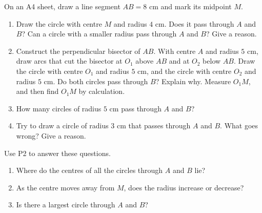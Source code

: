\begin{solvefirst}
  \item On an A4 sheet, draw a line segment $AB=8$ cm and mark its midpoint $M$.
  \begin{enumerate}[label=(\alph*),itemsep=1pt]
    \item Draw the circle with centre $M$ and radius $4$ cm. Does it pass through $A$ and $B$? Can a circle with a smaller radius pass through $A$ and $B$? Give a reason.
    \item Construct the perpendicular bisector of $AB$. With centre $A$ and radius $5$ cm, draw arcs that cut the bisector at $O_1$ above $AB$ and at $O_2$ below $AB$. Draw the circle with centre $O_1$ and radius $5$ cm, and the circle with centre $O_2$ and radius $5$ cm. Do both circles pass through $B$? Explain why. Measure $O_1M$, and then find $O_1M$ by calculation.
    \item How many circles of radius $5$ cm pass through $A$ and $B$?
    \item Try to draw a circle of radius $3$ cm that passes through $A$ and $B$. What goes wrong? Give a reason.
  \end{enumerate}
  \item Use P2 to answer these questions.
  \begin{enumerate}[label=(\alph*),itemsep=1pt]
    \item Where do the centres of all the circles through $A$ and $B$ lie?
    \item As the centre moves away from $M$, does the radius increase or decrease?
    \item Is there a largest circle through $A$ and $B$?
  \end{enumerate}
\end{solvefirst}

